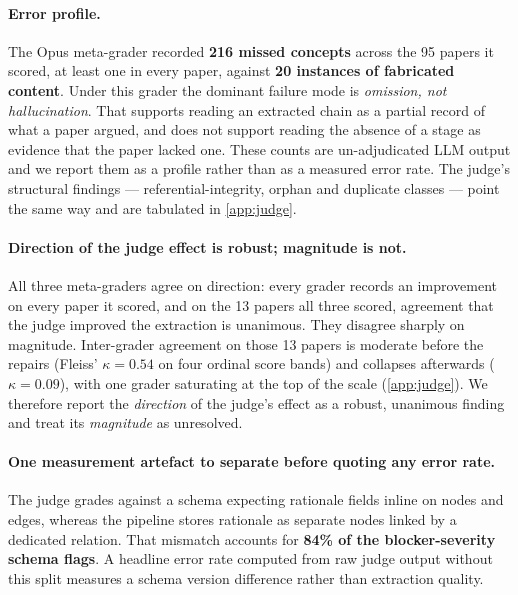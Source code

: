 \documentclass[10pt,twocolumn,letterpaper]{article}
\begin{document}
\paragraph{Error profile.} The Opus meta-grader recorded \textbf{216 missed concepts}
across the 95 papers it scored, at least one in every paper, against \textbf{20 instances
of fabricated content}. Under this grader the dominant failure mode is \emph{omission,
not hallucination}. That supports reading an extracted chain as a partial record of what
a paper argued, and does not support reading the absence of a stage as evidence that the
paper lacked one. These counts are un-adjudicated LLM output and we report them as a
profile rather than as a measured error rate. The judge's structural findings ---
referential-integrity, orphan and duplicate classes --- point the same way and are
tabulated in \cref{app:judge}.

\paragraph{Direction of the judge effect is robust; magnitude is not.} All three
meta-graders agree on direction: every grader records an improvement on every paper it
scored, and on the 13 papers all three scored, agreement that the judge improved the
extraction is unanimous. They disagree sharply on magnitude. Inter-grader agreement on
those 13 papers is moderate before the repairs (Fleiss' $\kappa = 0.54$ on four ordinal
score bands) and collapses afterwards ($\kappa = 0.09$), with one grader saturating at
the top of the scale (\cref{app:judge}). We therefore report the \emph{direction} of the
judge's effect as a robust, unanimous finding and treat its \emph{magnitude} as
unresolved.

\paragraph{One measurement artefact to separate before quoting any error rate.} The
judge grades against a schema expecting rationale fields inline on nodes and edges,
whereas the pipeline stores rationale as separate nodes linked by a dedicated relation.
That mismatch accounts for \textbf{84\% of the blocker-severity schema flags}. A headline
error rate computed from raw judge output without this split measures a schema version
difference rather than extraction quality.
\end{document}
